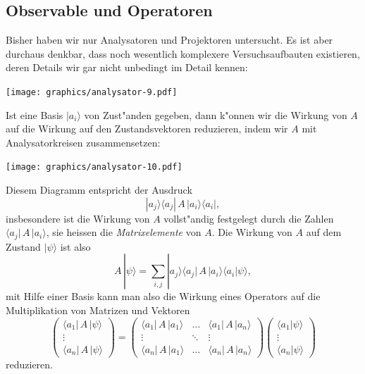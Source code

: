 \subsection{Observable und Operatoren}
Bisher haben wir nur Analysatoren und Projektoren untersucht.
Es ist aber durchaus denkbar, dass noch wesentlich komplexere
Versuchsaufbauten existieren, deren Details wir gar nicht unbedingt
im Detail kennen:
\begin{center}
\texttt{[image: graphics/analysator-9.pdf]}
\end{center}
Ist eine Basis $|a_i\rangle$ von Zust"anden gegeben, dann k"onnen
wir die Wirkung von $A$ auf die Wirkung auf den Zustandsvektoren
reduzieren, indem wir $A$ mit Analysatorkreisen zusammensetzen:
\begin{center}
\texttt{[image: graphics/analysator-10.pdf]}
\end{center}
Diesem Diagramm entspricht der Ausdruck
\[
|a_j\rangle \langle a_j|\, A \,|a_i\rangle \langle a_i|,
\]
insbesondere ist die Wirkung von $A$ vollst"andig festgelegt durch die
Zahlen
$\langle a_j|\,A\,|a_i\rangle$, sie heissen die {\em Matrixelemente} von $A$.
Die Wirkung von $A$ auf dem Zustand $|\psi\rangle$ ist also
\begin{equation}
A\,|\psi\rangle = \sum_{i,j} |a_j\rangle
	\langle a_j|\,A\,|a_i\rangle
	\langle a_i|\psi\rangle,
\label{skript:A-wirkung}
\end{equation}
mit Hilfe einer Basis kann man also die Wirkung eines Operators auf
die Multiplikation von Matrizen und Vektoren
\[
\begin{pmatrix}
\langle a_1|\,A\,|\psi\rangle\\
\vdots\\
\langle a_n|\,A\,|\psi\rangle
\end{pmatrix}
=
\begin{pmatrix}
\langle a_1|\,A\,|a_1\rangle&\dots &\langle a_1|\,A\,|a_n\rangle\\
\vdots                  &\ddots&\vdots                  \\
\langle a_n|\,A\,|a_1\rangle&\dots &\langle a_n|\,A\,|a_n\rangle
\end{pmatrix}
\begin{pmatrix}
\langle a_1|\psi\rangle\\
\vdots\\
\langle a_n|\psi\rangle
\end{pmatrix}
\]
reduzieren.

